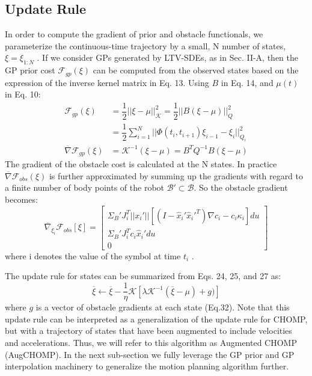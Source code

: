 \documentclass{IEEEtran}
\begin{document}
\subsection{Update Rule}
In order to compute the gradient of prior and obstacle
functionals, we parameterize the continuous-time trajectory
by a small, N number of states, $\xi=\xi_{1:N}$ . If we consider GPs
generated by LTV-SDEs, as in Sec. II-A, then the GP prior
cost $\mathcal{F}_{gp}(\xi)$ can be computed from the observed states based
on the expression of the inverse kernel matrix in Eq. 13.
Using $\textit{B}$ in Eq. 14, and $\mu(t)$ in Eq. 10:
\begin{align*}
\mathcal{F}_{gp}(\xi)&=\dfrac{1}{2}||\xi-\mu||_{\mathcal{K}}^2=\dfrac{1}{2}||B(\xi-\mu)||^2_Q\\
&=\dfrac{1}{2}\sum_{i=1}^{N}||\Phi(t_i,t_{i+1})\xi_{i-1}-\xi_i||^2_{Q_i}\tag{30}\\
\overline{\nabla}\mathcal{F}_{gp}(\xi)&=\mathcal{K}^{-1}(\xi-\mu)=B^TQ^{-1}B(\xi-\mu)\tag{31}
\end{align*}
The gradient of the obstacle cost is calculated at the N states.
In practice $\overline{\nabla}\mathcal{F}_{obs}(\xi)$ is further approximated by summing up
the gradients with regard to a finite number of body points
of the robot $\mathcal{B}'\subset \mathcal{B}$. So the obstacle gradient becomes:
\[
\overline{\nabla}_{\xi_i}\mathcal{F}_{obs}[\xi]=\begin{bmatrix}
\Sigma_B'J_i^T||x_i'||[(I-\widehat{x}_i'\widehat{x}_i'^T){\nabla}c_i-c_i\kappa_i]du\\
\Sigma_B'J_i^Tc_i \widehat{x}_i'du\\
0
\tag{32}
\end{bmatrix}
\]
where i denotes the value of the symbol at time $t_i$
.

The update rule for states can be summarized from
Eqs. 24, 25, and 27 as:
\begin{equation*}
\overline{\xi} \leftarrow \overline{\xi}-\dfrac{1}{\eta}{\mathcal{K}}[\lambda{\mathcal{K}}^{-1}(\overline{\xi}-\mu)+g)]\tag{33}
\end{equation*}
where $g$ is a vector of obstacle gradients at each state
(Eq.32). Note that this update rule can be interpreted as
a generalization of the update rule for CHOMP, but with
a trajectory of states that have been augmented to include
velocities and accelerations. Thus, we will refer to this
algorithm as Augmented CHOMP (AugCHOMP). In the
next sub-section we fully leverage the GP prior and GP
interpolation machinery to generalize the motion planning
algorithm further.
\end{document}
